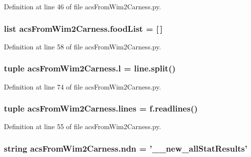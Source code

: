 Definition at line 46 of file acs\-From\-Wim2\-Carness.\-py.

\hypertarget{a00100_a878da371fd02e9515fe7305e0a57be09}{
\subsubsection[{food\-List}]{\setlength{\rightskip}{0pt plus 5cm}list acs\-From\-Wim2\-Carness.\-food\-List = \mbox{[}$\,$\mbox{]}}}\label{a00100_a878da371fd02e9515fe7305e0a57be09}


Definition at line 58 of file acs\-From\-Wim2\-Carness.\-py.

\hypertarget{a00100_a0437cd4d2a377ca0e34ab59f4bfd833f}{
\subsubsection[{l}]{\setlength{\rightskip}{0pt plus 5cm}tuple acs\-From\-Wim2\-Carness.\-l = {\bf line.\-split}()}}\label{a00100_a0437cd4d2a377ca0e34ab59f4bfd833f}


Definition at line 74 of file acs\-From\-Wim2\-Carness.\-py.

\hypertarget{a00100_a2a83f40b2aa2cbcbd487195fef9af340}{
\subsubsection[{lines}]{\setlength{\rightskip}{0pt plus 5cm}tuple acs\-From\-Wim2\-Carness.\-lines = f.\-readlines()}}\label{a00100_a2a83f40b2aa2cbcbd487195fef9af340}


Definition at line 55 of file acs\-From\-Wim2\-Carness.\-py.

\hypertarget{a00100_a6f995419ddd7f2de58506d9541238dbc}{
\subsubsection[{ndn}]{\setlength{\rightskip}{0pt plus 5cm}string acs\-From\-Wim2\-Carness.\-ndn = '\-\_\-\_\-new\-\_\-all\-Stat\-Results'}}\label{a00100_a6f995419ddd7f2de58506d9541238dbc}


